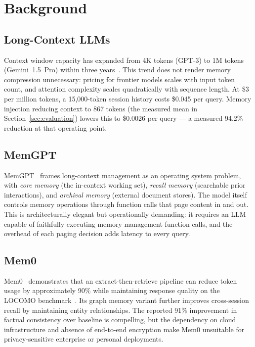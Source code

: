 \documentclass[10pt,twocolumn]{article}
\begin{document}
\section{Background}
\label{sec:background}

\subsection{Long-Context LLMs}

\noindent
Context window capacity has expanded from 4K tokens (GPT-3) to 1M tokens
(Gemini~1.5~Pro) within three years~\citep{vaswani2017attention}. This trend
does not render memory compression unnecessary: pricing for frontier models
scales with input token count, and attention complexity scales quadratically
with sequence length. At \$3 per million tokens, a 15,000-token session history
costs \$0.045 per query. Memory injection reducing context to 867 tokens
(the measured mean in Section~\ref{sec:evaluation}) lowers this to
\$0.0026 per query --- a measured 94.2\% reduction at that operating point.

\subsection{MemGPT}

\noindent
MemGPT~\citep{packer2023memgpt} frames long-context management as an operating
system problem, with \emph{core memory} (the in-context working set),
\emph{recall memory} (searchable prior interactions), and \emph{archival memory}
(external document stores). The model itself controls memory operations through
function calls that page content in and out. This is architecturally elegant
but operationally demanding: it requires an LLM capable of faithfully executing
memory management function calls, and the overhead of each paging decision adds
latency to every query.

\subsection{Mem0}

\noindent
Mem0~\citep{chhikara2025mem0} demonstrates that an extract-then-retrieve
pipeline can reduce token usage by approximately 90\% while maintaining response
quality on the LOCOMO benchmark~\citep{maharana2024locomo}. Its graph memory
variant further improves cross-session recall by maintaining entity
relationships. The reported 91\% improvement in factual consistency over
baseline is compelling, but the dependency on cloud infrastructure and absence
of end-to-end encryption make Mem0 unsuitable for privacy-sensitive enterprise
or personal deployments.
\end{document}
